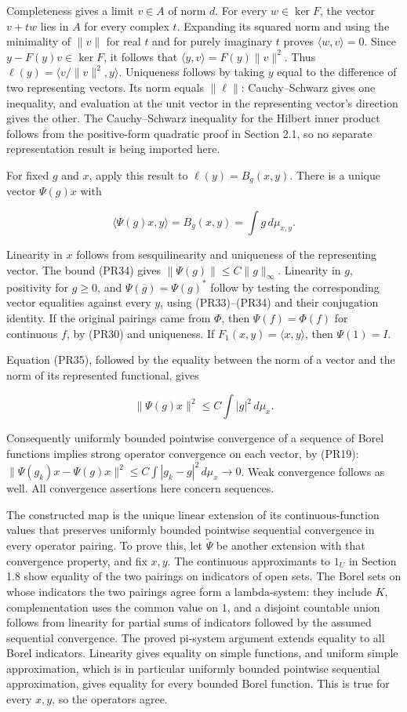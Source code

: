 \documentclass[
  11pt,
]{article}
\begin{document}
Completeness gives a limit \(v\in A\) of norm \(d\). For every
\(w\in\ker F\), the vector \(v+t w\) lies in \(A\) for every complex
\(t\). Expanding its squared norm and using the minimality of \(\|v\|\)
for real \(t\) and for purely imaginary \(t\) proves
\(\langle w,v\rangle=0\). Since \(y-F(y)v\in\ker F\), it follows that
\(\langle y,v\rangle=F(y)\|v\|^2\). Thus
\(\ell(y)=\langle v/\|v\|^2,y\rangle\). Uniqueness follows by taking
\(y\) equal to the difference of two representing vectors. Its norm
equals \(\|\ell\|\): Cauchy--Schwarz gives one inequality, and
evaluation at the unit vector in the representing vector's direction
gives the other. The Cauchy--Schwarz inequality for the Hilbert inner
product follows from the positive-form quadratic proof in Section 2.1,
so no separate representation result is being imported here.

For fixed \(g\) and \(x\), apply this result to \(\ell(y)=B_g(x,y)\).
There is a unique vector \(\Psi(g)x\) with

\[
\langle\Psi(g)x,y\rangle=B_g(x,y)=\int g\,d\mu_{x,y}.
\tag{PR38}
\]

Linearity in \(x\) follows from sesquilinearity and uniqueness of the
representing vector. The bound (PR34) gives
\(\|\Psi(g)\|\leq C\|g\|_\infty\). Linearity in \(g\), positivity for
\(g\geq0\), and \(\Psi(\overline g)=\Psi(g)^*\) follow by testing the
corresponding vector equalities against every \(y\), using
(PR33)--(PR34) and their conjugation identity. If the original pairings
came from \(\Phi\), then \(\Psi(f)=\Phi(f)\) for continuous \(f\), by
(PR30) and uniqueness. If \(F_1(x,y)=\langle x,y\rangle\), then
\(\Psi(1)=I\).

Equation (PR35), followed by the equality between the norm of a vector
and the norm of its represented functional, gives

\[
\|\Psi(g)x\|^2\leq C\int|g|^2\,d\mu_x.
\tag{PR39}
\]

Consequently uniformly bounded pointwise convergence of a sequence of
Borel functions implies strong operator convergence on each vector, by
(PR19): \(\|\Psi(g_k)x-\Psi(g)x\|^2\leq C\int|g_k-g|^2\,d\mu_x\to0\).
Weak convergence follows as well. All convergence assertions here
concern sequences.

The constructed map is the unique linear extension of its
continuous-function values that preserves uniformly bounded pointwise
sequential convergence in every operator pairing. To prove this, let
\(\widetilde\Psi\) be another extension with that convergence property,
and fix \(x,y\). The continuous approximants to \(1_U\) in Section 1.8
show equality of the two pairings on indicators of open sets. The Borel
sets on whose indicators the two pairings agree form a lambda-system:
they include \(K\), complementation uses the common value on \(1\), and
a disjoint countable union follows from linearity for partial sums of
indicators followed by the assumed sequential convergence. The proved
pi-system argument extends equality to all Borel indicators. Linearity
gives equality on simple functions, and uniform simple approximation,
which is in particular uniformly bounded pointwise sequential
approximation, gives equality for every bounded Borel function. This is
true for every \(x,y\), so the operators agree.
\end{document}
